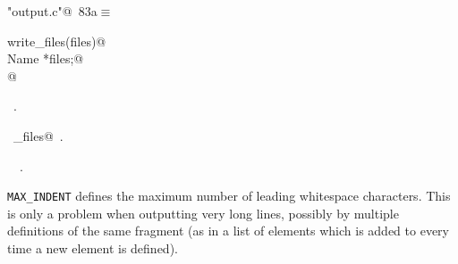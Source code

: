 \documentclass[a4paper]{report}
\begin{document}
\begin{flushleft} \small
\begin{minipage}{\linewidth}\label{scrap169}\raggedright\small
{} \verb@"output.c"@\nobreak\ {\footnotesize {83a}}$\equiv$
\vspace{-1ex}
\begin{list}{}{} \item
\mbox{}\verb@void write_files(files)@\\
\mbox{}\verb@     Name *files;@\\
\mbox{}@\\
\mbox{}\verb@@{\NWsep}
\end{list}
\vspace{-1.5ex}
\footnotesize
\begin{list}{}{\setlength{\itemsep}{-\parsep}\setlength{\itemindent}{-\leftmargin}}
\item \NWtxtFileDefBy\ .
\item \NWtxtIdentsDefed\nobreak\  \verb@write_files@\nobreak\ .\item \NWtxtIdentsUsed\nobreak\  \verb@Name@\nobreak\ .
\item{}
\end{list}
\end{minipage}\vspace{4ex}
\end{flushleft}
\verb|MAX_INDENT| defines the maximum number of leading whitespace
 characters. This is only a problem when outputting very long lines,
 possibly by multiple definitions of the same fragment (as in a list
 of elements which is added to every time a new element is defined).
\end{document}
